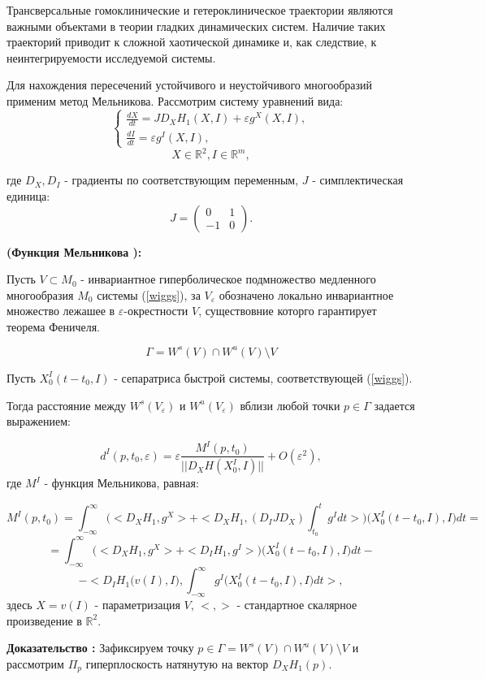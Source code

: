 
Трансверсальные гомоклинические и гетероклиническое траектории являются важными объектами в теории гладких динамических систем. Наличие таких траекторий приводит к сложной хаотической динамике и, как следствие, к неинтегрируемости исследуемой системы. 

Для нахождения пересечений устойчивого и неустойчивого многообразий применим метод Мельникова. Рассмотрим систему уравнений вида:
\begin{equation}
    \begin{cases}
        \frac{dX}{dt} = J D_X H_1(X,I) + \varepsilon g^X(X,I), \\
        \frac{dI}{dt} = \varepsilon g^I(X,I),
    \end{cases}
    \label{wiggs}
\end{equation}
$$X \in \mathbb{R}^2, I \in \mathbb{R}^m,$$


где $D_X, D_I$ - градиенты по соответствующим переменным, $J$ - симплектическая единица:
$$
 J = \begin{pmatrix}
  0  & 1 \\
  -1 & 0
 \end{pmatrix}.
$$

\begin{thm}
\textbf{(Функция Мельникова \cite{wiggins}):}

Пусть $V \subset M_0$ - инвариантное гиперболическое подмножество медленного многообразия $M_0$ системы (\ref{wiggs}), за $V_\varepsilon$ обозначено локально инвариантное множество лежашее в $\varepsilon$-окрестности $V$, существовние которго гарантирует теорема Феничеля.

$$\Gamma = W^s(V) \cap W^u(V) \setminus V$$


Пусть $X_0^I(t-t_0,I)$ - сепаратриса быстрой системы, соответствующей (\ref{wiggs}).

Тогда расстояние между $W^s(V_\varepsilon)$ и $W^u(V_\varepsilon)$ вблизи любой точки $p \in \Gamma$ задается выражением:

$$d^I(p, t_0, \varepsilon) = \varepsilon\frac{M^I(p,t_0)}{||D_X H(X_0^I, I)||} + O(\varepsilon^2),$$
где $M^I$ - функция Мельникова, равная:

$$M^I(p,t_0) = \int_{-\infty}^{\infty} \Big( <D_X H_1, g^X> + <D_X H_1, (D_I J D_X)\int_{t_0}^t g^I dt > \Big) \big(X_0^I(t-t_0,I),I \big)dt = $$
$$= \int_{- \infty}^{\infty} \Big( <D_X H_1, g^X> + <D_I H_1, g^I> \Big)\big(X_0^I(t-t_0,I), I \big)dt - $$
$$ -<D_I H_1 \big(v(I), I \big), \int_{- \infty}^{\infty} g^I \big(X_0^I(t-t_0,I), I \big)dt>,$$
здесь $X = v(I)$ - параметризация $V$, $<,>$ - стандартное скалярное произведение в $\mathbb{R}^2$.
\end{thm}
\textbf{Доказательство \cite{wiggins}:}
Зафиксируем точку $p \in \Gamma = W^s(V) \cap W^u(V) \setminus V$ и рассмотрим $\Pi_p$ гиперплоскость натянутую на вектор $D_X H_1(p)$.

